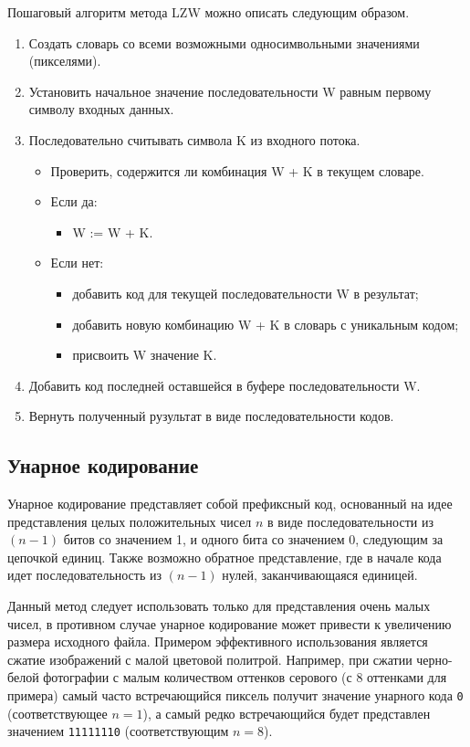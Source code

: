 Пошаговый алгоритм метода LZW можно описать следующим образом.
\begin{enumerate}
    \item Создать словарь со всеми возможными односимвольными значениями (пикселями).
    \item Установить начальное значение последовательности W равным первому символу входных данных.
    \item Последовательно считывать символа K из входного потока.
    \begin{itemize}
        \item Проверить, содержится ли комбинация W + K в текущем словаре.
        \item Если да:
        \begin{itemize}
            \item W := W + K.
        \end{itemize} 
        \item Если нет:
        \begin{itemize}
            \item добавить код для текущей последовательности W в результат;
            \item добавить новую комбинацию W + K в словарь с уникальным кодом;
            \item присвоить W значение K.
        \end{itemize}
    \end{itemize}
    \item Добавить код последней оставшейся в буфере последовательности W.
    \item Вернуть полученный рузультат в виде последовательности кодов.
\end{enumerate}

\subsection{Унарное кодирование}

Унарное кодирование \cite{UnaryEncoding} представляет собой префиксный код, основанный на идее представления целых положительных чисел $n$ в виде последовательности из $(n - 1)$ битов со значением 1, и одного бита со значением 0, следующим за цепочкой единиц. Также возможно обратное представление, где в начале кода идет последовательность из $(n - 1)$ нулей, заканчивающаяся единицей.

Данный метод следует использовать только для представления очень малых чисел, в противном случае унарное кодирование может привести к увеличению размера исходного файла. Примером эффективного использования является сжатие изображений с малой цветовой политрой. Например, при сжатии черно-белой фотографии с малым количеством оттенков серового (с 8 оттенками для примера) самый часто встречающийся пиксель получит значение унарного кода \texttt{0} (соответствующее $n = 1$), а самый редко встречающийся будет представлен значением \texttt{11111110} (соответствующим $n = 8$).

